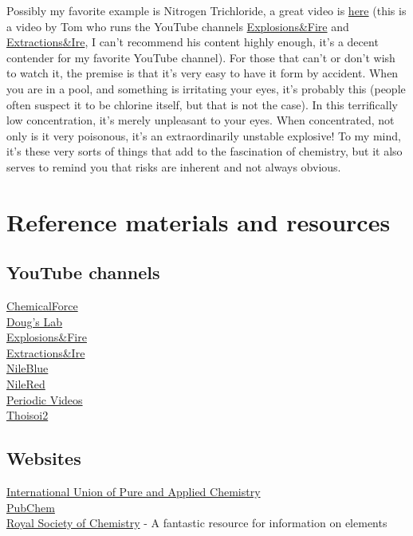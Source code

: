 \documentclass{book}
\begin{document}
Possibly my favorite example is Nitrogen Trichloride, a great video is \href{https://www.youtube.com/watch?v=mV_daaldE_I}{here} (this is a video by Tom who runs the YouTube channels \href{https://www.youtube.com/c/ExplosionsFire2}{Explosions\&Fire} and \href{https://www.youtube.com/c/ExtractionsIre}{Extractions\&Ire}, I can't recommend his content highly enough, it's a decent contender for my favorite YouTube channel).  For those that can't or don't wish to watch it, the premise is that it's very easy to have it form by accident.  When you are in a pool, and something is irritating your eyes, it's probably this (people often suspect it to be chlorine itself, but that is not the case).  In this terrifically low concentration, it's merely unpleasant to your eyes.  When concentrated, not only is it very poisonous, it's an extraordinarily unstable explosive!  To my mind, it's these very sorts of things that add to the fascination of chemistry, but it also serves to remind you that risks are inherent and not always obvious.\\

\section{Reference materials and resources}

\subsection{YouTube channels}
\href{https://www.youtube.com/c/ChemicalForce}{ChemicalForce}\\
\href{https://www.youtube.com/user/DougsLab}{Doug's Lab}\\
\href{https://www.youtube.com/c/ExplosionsFire2}{Explosions\&Fire}\\
\href{https://www.youtube.com/c/ExtractionsIre}{Extractions\&Ire}\\
\href{https://www.youtube.com/c/NileRed2}{NileBlue}\\
\href{https://www.youtube.com/c/NileRed}{NileRed}\\
\href{https://www.youtube.com/user/periodicvideose}{Periodic Videos}\\
\href{https://www.youtube.com/c/Thoisoi2}{Thoisoi2}\\

\subsection{Websites}
\href{https://iupac.org/}{International Union of Pure and Applied Chemistry}\\
\href{https://pubchem.ncbi.nlm.nih.gov/}{PubChem}\\
\href{https://www.rsc.org/}{Royal Society of Chemistry} - A fantastic resource for information on elements\\
\end{document}
